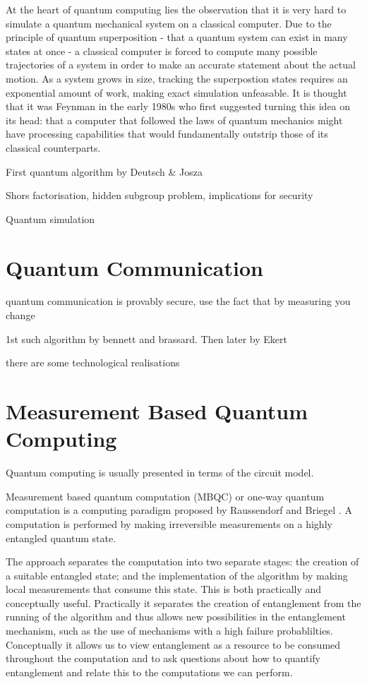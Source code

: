 At the heart of quantum computing lies the observation that it is very hard to simulate a quantum mechanical system on a classical computer. Due to the principle of quantum superposition - that a quantum system can exist in many states at once - a classical computer is forced to compute many possible trajectories of a system in order to make an accurate statement about the actual motion. As a system grows in size, tracking the superpostion states requires an exponential amount of work, making exact simulation unfeasable. It is thought that it was Feynman in the early 1980s \cite{feynman82} who first suggested turning this idea on its head: that a computer that followed the laws of quantum mechanics might have processing capabilities that would fundamentally outstrip those of its classical counterparts. 

First quantum algorithm by Deutsch \& Josza

Shors factorisation, hidden subgroup problem, implications for security

Quantum simulation

\section{Quantum Communication}

quantum communication is provably secure, use the fact that by measuring you change

1st such algorithm by bennett and brassard. Then later by Ekert

there are some technological realisations

\section{Measurement Based Quantum Computing}

Quantum computing is usually presented in terms of the circuit model. 

Measurement based quantum computation (MBQC) or one-way quantum computation is a computing paradigm proposed by Raussendorf and Briegel \cite{raussendorf01}. A computation is performed by making irreversible measurements on a highly entangled quantum state.

The approach separates the computation into two separate stages: the creation of a suitable entangled state; and the implementation of the algorithm by making local measurements that consume this state. This is both practically and conceptually useful. Practically it separates the creation of entanglement from the running of the algorithm and thus allows new possibilities in the entanglement mechanism, such as the use of mechanisms with a high failure probablilties. Conceptually it allows us to view entanglement as a resource to be consumed throughout the computation and to ask questions about how to quantify entanglement and relate this to the computations we can perform. 

